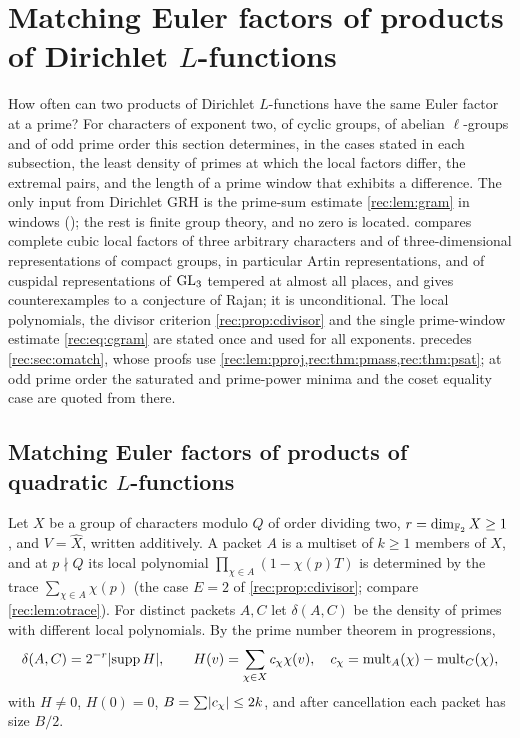 \providecommand{\recsinc}{\operatorname{sinc}}
\providecommand{\recgE}{\gamma_{\mathrm{E}}}
\providecommand{\recGen}{\operatorname{Gen}}
\providecommand{\recav}{\operatorname{av}}
\providecommand{\recA}{\mathcal{A}}
\providecommand{\recartanh}{\operatorname{artanh}}
\section{Matching Euler factors of products of Dirichlet \texorpdfstring{$L$}{L}-functions}\label{sec:eul}

How often can two products of Dirichlet $L$-functions have the same Euler factor at a prime? For
characters of exponent two, of cyclic groups, of abelian $\ell$-groups and of odd prime order this
section determines, in the cases stated in each subsection, the least density of primes at which the
local factors differ, the extremal pairs, and the length of a prime window that exhibits a difference.
The only input from Dirichlet GRH is the prime-sum estimate \cref{rec:lem:gram} in windows (\stG); the rest is finite group theory, and no zero is located.
 compares complete cubic local factors of three arbitrary characters and of
three-dimensional representations of compact groups, in particular Artin representations, and of cuspidal
representations of $\operatorname{GL}_3$ tempered at almost all places, and gives counterexamples to a conjecture of Rajan; it is unconditional.
The local polynomials, the divisor criterion \cref{rec:prop:cdivisor} and the single prime-window
estimate \eqref{rec:eq:cgram} are stated once and used for all exponents.  precedes
\cref{rec:sec:omatch}, whose proofs use \cref{rec:lem:pproj,rec:thm:pmass,rec:thm:psat}; at odd prime
order the saturated and prime-power minima and the coset equality case are quoted from there.

\subsection{Matching Euler factors of products of quadratic $L$-functions}\label{rec:sec:qmatch}

Let $X$ be a group of characters modulo $Q$ of order dividing two, $r=\dim_{\mathbb{F}_2}X\ge1$, and $V=\widehat X$,
written additively. A packet $A$ is a multiset of $k\ge1$ members of $X$, and at $p\nmid Q$ its local
polynomial $\prod_{\chi\in A}(1-\chi(p)T)$ is determined by the trace $\sum_{\chi\in A}\chi(p)$ (the case $E=2$ of
\cref{rec:prop:cdivisor}; compare \cref{rec:lem:otrace}). For distinct packets $A,C$ let
$\delta(A,C)$ be the density of primes with different local polynomials. By the prime number theorem in
progressions,
\[
 \delta(A,C)=2^{-r}\lvert\operatorname{supp} H\rvert,\qquad H(v)=\sum_{\chi\in X}c_\chi\chi(v),\quad c_\chi=\operatorname{mult}_A(\chi)-\operatorname{mult}_C(\chi),
\]
with $H\ne0$, $H(0)=0$, $B=\sum\lvert c_\chi\rvert\le2k$, and after cancellation each packet has size $B/2$.

